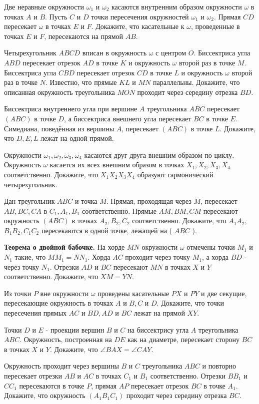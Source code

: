Две неравные окружности $\omega_1$ и $\omega_2$ касаются внутренним образом окружности $\omega$ в точках $A$ и $B$. Пусть $C$ и $D$ точки пересечения окружностей $\omega_1$ и $\omega_2$. Прямая $C D$ пересекает $\omega$ в точках $E$ и $F$. Докажите, что касательные к $\omega$, проведенные в точках $E$ и $F$, пересекаются на прямой $A B$.

\newpage

\hspace{3mm}

Четырехугольник $A B C D$ вписан в окружность $\omega$ с центром $O$. Биссектриса угла $A B D$ пересекает отрезок $A D$ в точке $K$ и окружность $\omega$ второй раз в точке $M$. Биссектриса угла $C B D$ пересекает отрезок $C D$ в точке $L$ и окружность $\omega$ второй раз в точке $N$. Известно, что прямые $K L$ и $M N$ параллельны. Докажите, что описанная окружность треугольника $M O N$ проходит через середину отрезка $B D$.


Биссектриса внутреннего угла при вершине $A$ треугольника $A B C$ пересекает $(A B C)$ в точке $D$, а биссектриса внешнего угла пересекает $B C$ в точке $E$. Симедиана, поведённая из вершины $A$, пересекает $(A B C)$ в точке $L$. Докажите, что $D, E, L$ лежат на одной прямой.

Окружности $\omega_1, \omega_2, \omega_3, \omega_4$ касаются друг друга внешним образом по циклу. Окружность $\omega$ касается их всех внешним образом в точках $X_1, X_2, X_3, X_4$ соответственно. Докажите, что $X_1 X_2 X_3 X_4$ образуют гармонический четырехугольник.

Дан треугольник $A B C$ и точка $M$. Прямая, проходящая через $M$, пересекает $A B, B C, C A$ в $C_1, A_1, B_1$ соответственно. Прямые $A M, B M, C M$ пересекают окружность $(A B C)$ в точках $A_2, B_2, C_2$ соответственно. Докажите, что $A_1 A_2$, $B_1 B_2, C_1 C_2$ пересекаются в одной точке, лежащей на ( $A B C$ ).

\textbf{Теорема о двойной бабочке.}
На хорде $M N$ окружности $\omega$ отмечены точки $M_1$ и $N_1$ такие, что $M M_1=N N_1$. Хорда $A C$ проходит через точку $M_1$, а хорда $B D$ - через точку $N_1$. Отрезки $A D$ и $B C$ пересекают $M N$ в точках $X$ и $Y$ соответственно. Докажите, что $X M=Y N$.

Из точки $P$ вне окружности $\omega$ проведены касательные $P X$ и $P Y$ и две секущие, пересекающие окружность в точках $A$ и $B, C$ и $D$. Докажите, что точки пересечения прямых $A C$ и $B D, A D$ и $B C$ лежат на прямой $X Y$.

Точки $D$ и $E$ - проекции вершин $B$ и $C$ на биссектрису угла $A$ треугольника $A B C$. Окружность, построенная на $D E$ как на диаметре, пересекает сторону $B C$ в точках $X$ и $Y$. Докажите, что $\angle B A X=\angle C A Y$.

Окружность проходит через вершины $B$ и $C$ треугольника $A B C$ и повторно пересекает отрезки $A B$ и $A C$ в точках $C_1$ и $B_1$ соответственно. Отрезки $B B_1$ и $C C_1$ пересекаются в точке $P$, прямая $A P$ пересекает отрезок $B C$ в точке $A_1$. Докажите, что окружность $(A_1 B_1 C_1)$ проходит через середину отрезка $B C$.